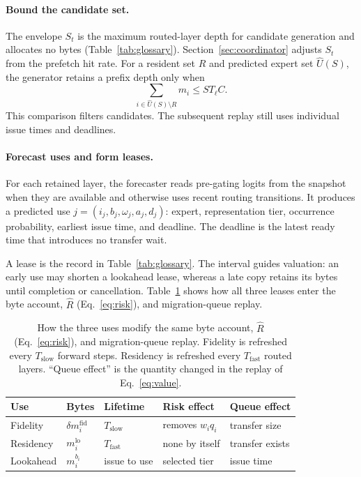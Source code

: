 \paragraph{Bound the candidate set.}
The envelope \(S_t\) is the maximum routed-layer depth for candidate generation and allocates no bytes (Table~\ref{tab:glossary}).
Section~\ref{sec:coordinator} adjusts \(S_t\) from the prefetch hit rate.
For a resident set \(R\) and predicted expert set \(\hat U(S)\), the generator retains a prefix depth only when
\begin{equation}
  \sum_{i\in\hat U(S)\setminus R}m_i\le S T_{\ell}C.
  \label{eq:overlap}
\end{equation}
This comparison filters candidates.
The subsequent replay still uses individual issue times and deadlines.

\paragraph{Forecast uses and form leases.}
For each retained layer, the forecaster reads pre-gating logits from the snapshot when they are available and otherwise uses recent routing transitions.
It produces a predicted use \(j=(i_j,b_j,\omega_j,a_j,d_j)\): expert, representation tier, occurrence probability, earliest issue time, and deadline.
The deadline is the latest ready time that introduces no transfer wait.

A lease is the record in Table~\ref{tab:glossary}.
The interval guides valuation: an early use may shorten a lookahead lease, whereas a late copy retains its bytes until completion or cancellation.
Table~\ref{tab:lease-fields} shows how all three leases enter the byte account, \(\widehat R\) (Eq.~\eqref{eq:risk}), and migration-queue replay.

\begin{table}[t]
  \caption{How the three uses modify the same byte account, \(\widehat R\) (Eq.~\eqref{eq:risk}), and migration-queue replay.
  Fidelity is refreshed every \(T_{\mathrm{slow}}\) forward steps.
  Residency is refreshed every \(T_{\mathrm{fast}}\) routed layers.
  ``Queue effect'' is the quantity changed in the replay of Eq.~\eqref{eq:value}.}
  \label{tab:lease-fields}
  \small
  \setlength{\tabcolsep}{2.5pt}
  \begin{tabularx}{\columnwidth}{@{}>{\raggedright\arraybackslash}p{}>{\raggedright\arraybackslash}p{}>{\raggedright\arraybackslash}p{}>{\raggedright\arraybackslash}p{}>{\raggedright\arraybackslash}X@{}}
    \toprule
    Use & Bytes & Lifetime & Risk effect & Queue effect \\
    \midrule
    Fidelity & \(\delta m_i^{\mathrm{fid}}\) & \(T_{\mathrm{slow}}\) & removes \(w_iq_i\) & transfer size \\
    Residency & \(m_i^{\mathrm{lo}}\) & \(T_{\mathrm{fast}}\) & none by itself & transfer exists \\
    Lookahead & \(m_i^{b_i}\) & issue to use & selected tier & issue time \\
    \bottomrule
  \end{tabularx}
\end{table}

